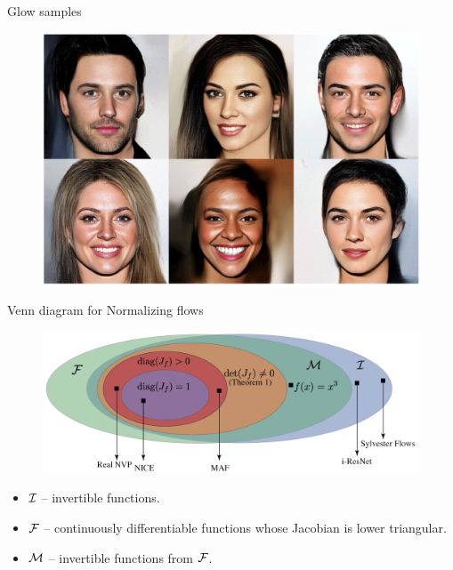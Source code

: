 \begin{frame}{Glow samples}
	\begin{figure}
		\centering
		\includegraphics[width=\linewidth]{figs/glow_faces.png}
	\end{figure}
\end{frame}
\begin{frame}{Venn diagram for Normalizing flows}
	
	\begin{figure}
		\centering
		\includegraphics[width=\linewidth]{figs/venn_diagram}
	\end{figure}
	\begin{itemize}
		\item $\mathcal{I}$ -- invertible functions.
		\item $\mathcal{F}$ -- continuously differentiable functions whose Jacobian is lower triangular.
		\item $\mathcal{M}$ -- invertible functions from $\mathcal{F}$.
	\end{itemize}
\end{frame}
